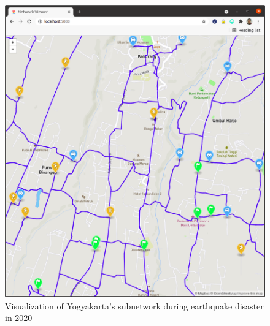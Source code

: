 \documentclass[conference]{IEEEtran}
\begin{document}
\begin{figure}
\centerline{\includegraphics[scale=0.23]{subnetwork-visualization-zoom-1-yogyakarta.png}}
\caption{Visualization of Yogyakarta's subnetwork during earthquake disaster in 2020}
\label{fig_yogyakarta_subnetwork_visualized}
\end{figure}
\end{document}
